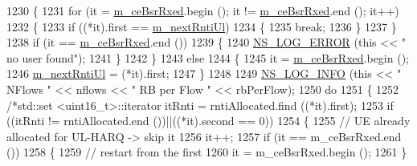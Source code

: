 \begin{DoxyCode}
1230         \{
1231                 \textcolor{keywordflow}{for} (it = \hyperlink{classns3_1_1MmWaveRrMacScheduler_a2ebec374f1ff5014f115ff8b68ff5ebb}{m\_ceBsrRxed}.begin (); it != \hyperlink{classns3_1_1MmWaveRrMacScheduler_a2ebec374f1ff5014f115ff8b68ff5ebb}{m\_ceBsrRxed}.end (); it++)
1232                 \{
1233                         \textcolor{keywordflow}{if} ((*it).first == \hyperlink{classns3_1_1MmWaveRrMacScheduler_ac9c27bbc2f828923b14cbc3b6ed5be57}{m\_nextRntiUl})
1234                         \{
1235                                 \textcolor{keywordflow}{break};
1236                         \}
1237                 \}
1238                 \textcolor{keywordflow}{if} (it == \hyperlink{classns3_1_1MmWaveRrMacScheduler_a2ebec374f1ff5014f115ff8b68ff5ebb}{m\_ceBsrRxed}.end ())
1239                 \{
1240                         \hyperlink{group__logging_ga0261a8db1d4ac5f79417d117634fd455}{NS\_LOG\_ERROR} (\textcolor{keyword}{this} << \textcolor{stringliteral}{" no user found"});
1241                 \}
1242         \}
1243         \textcolor{keywordflow}{else}
1244         \{
1245                 it = \hyperlink{classns3_1_1MmWaveRrMacScheduler_a2ebec374f1ff5014f115ff8b68ff5ebb}{m\_ceBsrRxed}.begin ();
1246                 \hyperlink{classns3_1_1MmWaveRrMacScheduler_ac9c27bbc2f828923b14cbc3b6ed5be57}{m\_nextRntiUl} = (*it).first;
1247         \}
1248 
1249         \hyperlink{group__logging_gafbd73ee2cf9f26b319f49086d8e860fb}{NS\_LOG\_INFO} (\textcolor{keyword}{this} << \textcolor{stringliteral}{" NFlows "} << nflows << \textcolor{stringliteral}{" RB per Flow "} << rbPerFlow);
1250         \textcolor{keywordflow}{do}
1251         \{
1252                 \textcolor{comment}{/*std::set <uint16\_t>::iterator itRnti = rntiAllocated.find ((*it).first);}
1253 \textcolor{comment}{                                        if ((itRnti != rntiAllocated.end ())||((*it).second == 0))}
1254 \textcolor{comment}{                                        \{}
1255 \textcolor{comment}{                                                // UE already allocated for UL-HARQ -> skip it}
1256 \textcolor{comment}{                                                it++;}
1257 \textcolor{comment}{                                                if (it == m\_ceBsrRxed.end ())}
1258 \textcolor{comment}{                                                \{}
1259 \textcolor{comment}{                                                        // restart from the first}
1260 \textcolor{comment}{                                                        it = m\_ceBsrRxed.begin ();}
1261 \textcolor{comment}{                                                \}}

\end{DoxyCode}
